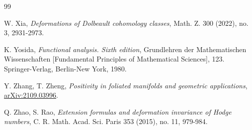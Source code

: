 \documentclass[12pt]{amsart}
\numberwithin{equation}{section}
\theoremstyle{definition}
\theoremstyle{definition}
\theoremstyle{definition}
\renewcommand{\1}{\mathsf{1}}
\renewcommand{\>}{\rightarrow}
\theoremstyle{plain} %
\theoremstyle{plain} %
\theoremstyle{plain} %
\begin{document}
\begin{thebibliography}{99}
		
		
		W. Xia,\textit{ Deformations of Dolbeault cohomology classes},
		\newblock Math. Z. 300 (2022), no. 3, 2931-2973.
		
		
		
		 K. Yosida, \newblock\textit{Functional analysis. Sixth edition},
		\newblock Grundlehren der Mathematischen Wissenschaften [Fundamental Principles of Mathematical Sciences], 123.
		Springer-Verlag, Berlin-New York, 1980.
		
		
		
		 Y.  Zhang, T. Zheng,
		\textit{Positivity in foliated manifolds and geometric applications},
		\href{https://arxiv.org/abs/2109.03996}{arXiv:2109.03996}.
		
		  Q. Zhao, S. Rao,
		\newblock \textit{Extension formulas and deformation invariance of Hodge numbers},
		\newblock C. R. Math. Acad. Sci. Paris 353
		(2015), no. 11, 979-984.
		
		
	\end{thebibliography}
\end{document}
